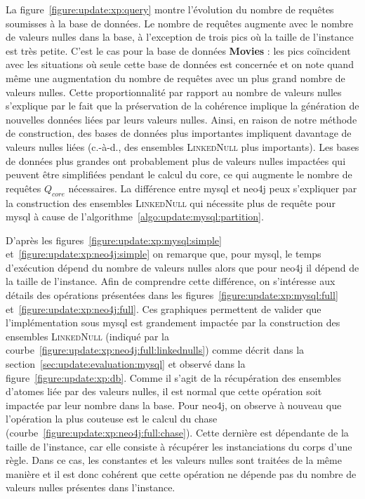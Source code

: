 La figure~\ref{figure:update:xp:query} montre l'évolution du nombre de requêtes soumisses à la base de données.
Le nombre de requêtes augmente avec le nombre de valeurs nulles dans la base, à l'exception de trois pics où la taille de l'instance est très petite.
C'est le cas pour la base de données \textbf{Movies} : les pics coïncident avec les situations où seule cette base de données est concernée et on note quand même une augmentation du nombre de requêtes avec un plus grand nombre de valeurs nulles.
Cette proportionnalité par rapport au nombre de valeurs nulles s'explique par le fait que la préservation de la cohérence implique la génération de nouvelles données liées par leurs valeurs nulles.
Ainsi, en raison de notre méthode de construction, des bases de données plus importantes impliquent davantage de valeurs nulles liées (c.-à-d., des ensembles \textsc{LinkedNull} plus importants).
Les bases de données plus grandes ont probablement plus de valeurs nulles impactées qui peuvent être simplifiées pendant le calcul du \gls{core}, ce qui augmente le nombre de requêtes $Q_{core}$ nécessaires.
La différence entre \gls{mysql} et \gls{neo4j} peux s'expliquer par la construction des ensembles \textsc{LinkedNull} qui nécessite plus de requête pour \gls{mysql} à cause de l'algorithme~\ref{algo:update:mysql:partition}.

D'après les figures~\ref{figure:update:xp:mysql:simple} et~\ref{figure:update:xp:neo4j:simple} on remarque que, pour \gls{mysql}, le temps d'exécution dépend du nombre de valeurs nulles alors que pour \gls{neo4j} il dépend de la taille de l'instance.
Afin de comprendre cette différence, on s'intéresse aux détails des opérations présentées dans les figures~\ref{figure:update:xp:mysql:full} et~\ref{figure:update:xp:neo4j:full}.
Ces graphiques permettent de valider que l'implémentation sous \gls{mysql} est grandement impactée par la construction des ensembles \textsc{LinkedNull} (indiqué par la courbe~\ref{figure:update:xp:neo4j:full:linkednulls}) comme décrit dans la section~\ref{sec:update:evaluation:mysql} et observé dans la figure~\ref{figure:update:xp:db}.
Comme il s'agit de la récupération des ensembles d'atomes liée par des valeurs nulles, il est normal que cette opération soit impactée par leur nombre dans la base.
Pour \gls{neo4j}, on observe à nouveau que l'opération la plus couteuse est le calcul du \gls{chase} (courbe~\ref{figure:update:xp:neo4j:full:chase}).
Cette dernière est dépendante de la taille de l'instance, car elle consiste à récupérer les instanciations du corps d'une règle.
Dans ce cas, les constantes et les valeurs nulles sont traitées de la même manière et il est donc cohérent que cette opération ne dépende pas du nombre de valeurs nulles présentes dans l'instance.


